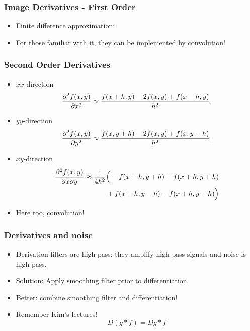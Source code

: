 \documentclass[10pt]{beamer}
\begin{document}
\begin{frame}
  \frametitle{Image Derivatives - First Order}
  \begin{itemize}
  \item Finite difference approximation:
  \item For those familiar with it, they can be implemented by convolution!
  \end{itemize}
\end{frame}

\begin{frame}
  \frametitle{Second Order Derivatives}
  \begin{itemize}
  \item $xx$-direction
    $$
    \frac{\partial^{2}{f(x,y)}}{\partial{x^2}} \approx\frac{f(x+h,y)-2f(x,y)+f(x-h,y)}{h^2},
    $$
  \item $yy$-direction
    $$
    \frac{\partial^{2}{f(x,y)}}{\partial{y^2}} \approx\frac{f(x,y+h)-2f(x,y)+f(x,y-h)}{h^2},
    $$
  \item $xy$-direction
    \begin{align*}
    \frac{\partial^{2}{f(x,y)}}{\partial{x\partial y}}\approx \frac{1}{4h^2}&\Big(
      -f(x-h,y+h) +f(x+h,y+h)\\
      &+f(x-h,y-h)  -f(x+h,y-h)\Big)
    \end{align*}
  \item Here too, convolution!
  \end{itemize}
\end{frame}




\begin{frame}
  \frametitle{Derivatives and noise}
  \begin{itemize}
  \item Derivation filters are high pass: they amplify high pass signals and noise is high pass.
  \item Solution: Apply smoothing filter prior to differentiation.\vfill 
  \item Better: combine smoothing filter and differentiation!\vfill
  \item Remember Kim's lectures!
    $$
    D\left( g\ast f\right) = Dg\ast f
    $$
  \end{itemize}
\end{frame}
\end{document}
